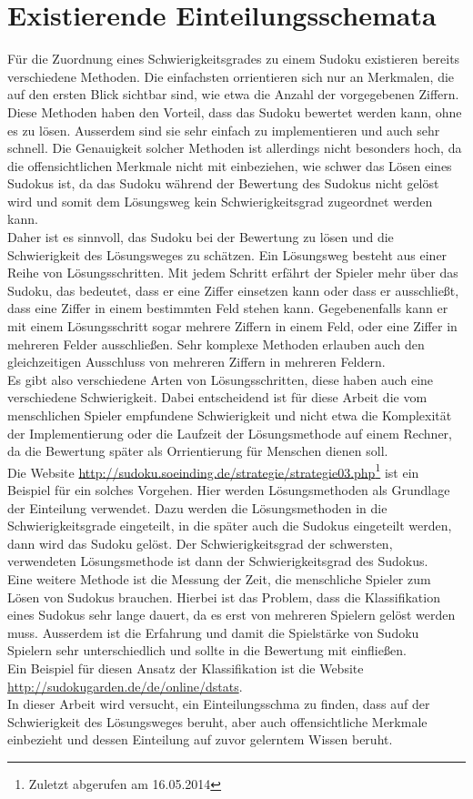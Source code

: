 \newpage
\section{Existierende Einteilungsschemata}
\label{Einteilungen}
Für die Zuordnung eines Schwierigkeitsgrades zu einem Sudoku existieren bereits verschiedene Methoden. Die einfachsten orrientieren sich nur an Merkmalen, die auf den ersten Blick sichtbar sind, wie etwa die Anzahl der vorgegebenen Ziffern. Diese Methoden haben den Vorteil, dass das Sudoku bewertet werden kann, ohne es zu lösen. Ausserdem sind sie sehr einfach zu implementieren und auch sehr schnell. Die Genauigkeit solcher Methoden ist allerdings nicht besonders hoch, da die offensichtlichen Merkmale nicht mit einbeziehen, wie schwer das Lösen eines Sudokus ist, da das Sudoku während der Bewertung des Sudokus nicht gelöst wird und somit dem Lösungsweg kein Schwierigkeitsgrad zugeordnet werden kann.\\
Daher ist es sinnvoll, das Sudoku bei der Bewertung zu lösen und die Schwierigkeit des Lösungsweges zu schätzen. Ein Lösungsweg besteht aus einer Reihe von Lösungsschritten. Mit jedem Schritt erfährt der Spieler mehr über das Sudoku, das bedeutet, dass er eine Ziffer einsetzen kann oder dass er ausschließt, dass eine Ziffer in einem bestimmten Feld stehen kann. Gegebenenfalls kann er mit einem Lösungsschritt sogar mehrere Ziffern in einem Feld, oder eine Ziffer in mehreren Felder ausschließen. Sehr komplexe Methoden erlauben auch den gleichzeitigen Ausschluss von mehreren Ziffern in mehreren Feldern.\\
Es gibt also verschiedene Arten von Lösungsschritten, diese haben auch eine verschiedene Schwierigkeit. Dabei entscheidend ist für diese Arbeit die vom menschlichen Spieler empfundene Schwierigkeit und nicht etwa die Komplexität der Implementierung oder die Laufzeit der Lösungsmethode auf einem Rechner, da die Bewertung später als Orrientierung für Menschen dienen soll.\\
Die Website \url{http://sudoku.soeinding.de/strategie/strategie03.php}\footnote{Zuletzt abgerufen am 16.05.2014} ist ein Beispiel für ein solches Vorgehen. Hier werden Lösungsmethoden als Grundlage der Einteilung verwendet. Dazu werden die Lösungsmethoden in die Schwierigkeitsgrade eingeteilt, in die später auch die Sudokus eingeteilt werden, dann wird das Sudoku gelöst. Der Schwierigkeitsgrad der schwersten, verwendeten Lösungsmethode ist dann der Schwierigkeitsgrad des Sudokus.\\
Eine weitere Methode ist die Messung der Zeit, die menschliche Spieler zum Lösen von Sudokus brauchen. Hierbei ist das Problem, dass die Klassifikation eines Sudokus sehr lange dauert, da es erst von mehreren Spielern gelöst werden muss. Ausserdem ist die Erfahrung und damit die Spielstärke von Sudoku Spielern sehr unterschiedlich und sollte in die Bewertung mit einfließen.\\
Ein Beispiel für diesen Ansatz der Klassifikation ist die Website \url{http://sudokugarden.de/de/online/dstats}.\\
In dieser Arbeit wird versucht, ein Einteilungsschma zu finden, dass auf der Schwierigkeit des Lösungsweges beruht, aber auch offensichtliche Merkmale einbezieht und dessen Einteilung auf zuvor gelerntem Wissen beruht.